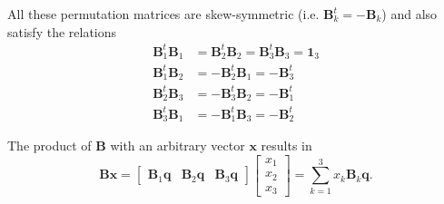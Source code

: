 \documentclass[aip,jcp,reprint,amsmath,amssymb,raggedbottom]{revtex4-1}
\newcommand{\mt}[1]{\boldsymbol{\mathbf{#1}}}           %
\newcommand{\vt}[1]{\boldsymbol{\mathbf{#1}}}           %
\newcommand{\tr}[1]{#1^t}                               %
\begin{document}

All these permutation matrices are skew-symmetric (i.e. $\tr{\mt B_k} = -\mt B_k$) and also satisfy the relations\cite{Dichmann1999}
\begin{equation}
\label{eq:BB_products}
\begin{aligned}
\tr{\mt B_1}{\mt B_1} &= \tr{\mt B_2}{\mt B_2} = \tr{\mt B_3}{\mt B_3} = \mt 1_3 \\
\tr{\mt B_1}{\mt B_2} &= -\tr{\mt B_2}{\mt B_1} = -\tr{\mt B_3} \\
\tr{\mt B_2}{\mt B_3} &= -\tr{\mt B_3}{\mt B_2} = -\tr{\mt B_1} \\
\tr{\mt B_3}{\mt B_1} &= -\tr{\mt B_1}{\mt B_3} = -\tr{\mt B_2}
\end{aligned}
\end{equation}

The product of $\mt B$ with an arbitrary vector $\vt x$ results in
\begin{equation}
\label{eq:product_B_vector}
\mt B \vt x = \left[ \begin{array}{ccc} \mt B_1 \vt q & \mt B_2 \vt q & \mt B_3 \vt q \end{array}\right] \left[ \begin{array}{c} x_1 \\ x_2 \\ x_3 \end{array} \right] = \sum_{k=1}^3 x_k {\mt B}_k \vt q.
\end{equation}
\end{document}
